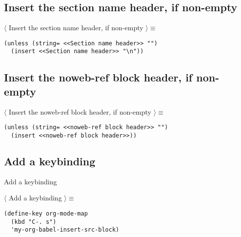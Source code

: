 \documentclass[11pt]{article}
\begin{document}
\subsection{Insert the section name header, if non-empty}
\label{sec:org155f751}

\noindent\(\langle\) Insert the section name header, if non-empty \(\rangle \equiv\)
\begin{verbatim}
(unless (string= <<Section name header>> "")
  (insert <<Section name header>> "\n"))
\end{verbatim}

\subsection{Insert the noweb-ref block header, if non-empty}
\label{sec:orgbe84174}

\noindent\(\langle\) Insert the noweb-ref block header, if non-empty \(\rangle \equiv\)
\begin{verbatim}
(unless (string= <<noweb-ref block header>> "")
  (insert <<noweb-ref block header>>))
\end{verbatim}

\subsection{Add a keybinding}
\label{sec:orgca29309}

Add a keybinding

\noindent\(\langle\) Add a keybinding \(\rangle \equiv\)
\begin{verbatim}
(define-key org-mode-map
  (kbd "C-. s")
  'my-org-babel-insert-src-block)
\end{verbatim}
\end{document}

